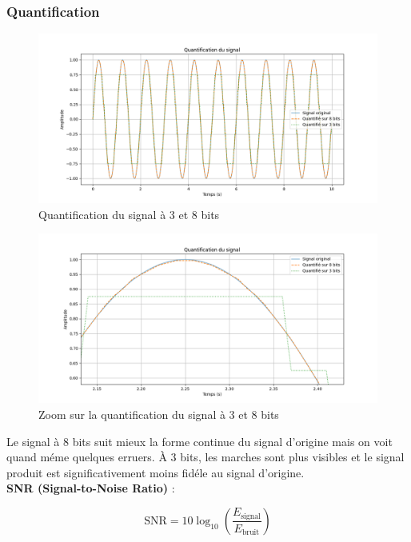 \subsubsection{Quantification}

\begin{figure}[!h]
\centering
\includegraphics[width=15.5cm]{screenshots/quantification_graph.png}
\caption{Quantification du signal à 3 et 8 bits}
\end{figure}

\begin{figure}[!h]
\centering
\includegraphics[width=17cm]{screenshots/quantification_graph_zoomed.png}
\caption{Zoom sur la quantification du signal à 3 et 8 bits}
\end{figure}

Le signal à 8 bits suit mieux la forme continue du signal d’origine mais on voit quand méme quelques erruers. À 3 bits, les marches sont plus visibles et le signal produit est significativement moins fidéle au signal d'origine.\\

\textbf{SNR (Signal-to-Noise Ratio)} :

\[
\text{SNR} = 10 \log_{10} \left(\frac{E_{\text{signal}}}{E_{\text{bruit}}} \right)
\]


